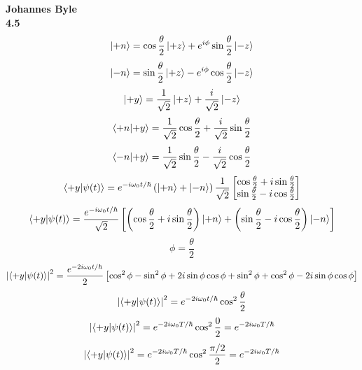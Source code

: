 \documentclass[english]{article}
\begin{document}
\textbf{Johannes Byle}\\

\noindent
\textbf{4.5}\\
$$\ket{+n}=\cos\frac{\theta}{2}\ket{+z}+e^{i\phi}\sin\frac{\theta}{2}\ket{-z}$$
$$\ket{-n}=\sin\frac{\theta}{2}\ket{+z}-e^{i\phi}\cos\frac{\theta}{2}\ket{-z}$$
$$\ket{+y}=\frac{1}{\sqrt{2}}\ket{+z}+\frac{i}{\sqrt{2}}\ket{-z}$$
$$\bra{+n}\ket{+y}=\frac{1}{\sqrt{2}}\cos\frac{\theta}{2}+\frac{i}{\sqrt{2}}\sin\frac{\theta}{2}$$
$$\bra{-n}\ket{+y}=\frac{1}{\sqrt{2}}\sin\frac{\theta}{2}-\frac{i}{\sqrt{2}}\cos\frac{\theta}{2}$$
\[
\bra{+y}\ket{\psi(t)}=e^{-i\omega_0t/\hbar}\left(\ket{+n}+\ket{-n}\right)\frac{1}{\sqrt{2}}
\begin{bmatrix}
\cos\frac{\theta}{2}+i\sin\frac{\theta}{2} \\
\sin\frac{\theta}{2}-i\cos\frac{\theta}{2}
\end{bmatrix}
\]
$$\bra{+y}\ket{\psi(t)}=\frac{e^{-i\omega_0t/\hbar}}{\sqrt{2}}\left[\left(\cos\frac{\theta}{2}+i\sin\frac{\theta}{2}\right)\ket{+n}+\left(\sin\frac{\theta}{2}-i\cos\frac{\theta}{2}\right)\ket{-n}\right]$$
$$\phi=\frac{\theta}{2}$$
$$\left|\bra{+y}\ket{\psi(t)}\right|^2=\frac{e^{-2i\omega_0t/\hbar}}{2}\left[\cos^2\phi-\sin^2\phi+2i\sin\phi\cos\phi+\sin^2\phi+\cos^2\phi-2i\sin\phi\cos\phi\right]$$
$$\left|\bra{+y}\ket{\psi(t)}\right|^2=e^{-2i\omega_0t/\hbar}\cos^2\frac{\theta}{2}$$
$$\left|\bra{+y}\ket{\psi(t)}\right|^2=e^{-2i\omega_0T/\hbar}\cos^2\frac{0}{2}=e^{-2i\omega_0T/\hbar}$$
$$\left|\bra{+y}\ket{\psi(t)}\right|^2=e^{-2i\omega_0T/\hbar}\cos^2\frac{\pi/2}{2}=e^{-2i\omega_0T/\hbar}$$
\end{document}
